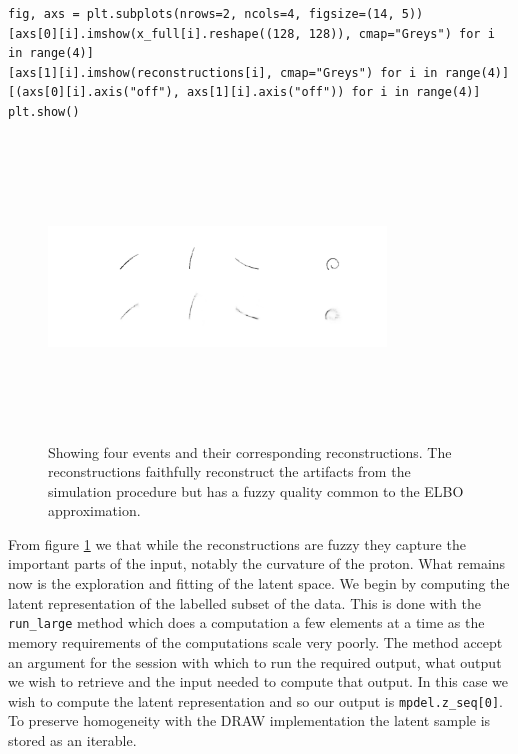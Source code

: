 \begin{minipage}{\linewidth}
\begin{lstlisting}[language=iPython]
fig, axs = plt.subplots(nrows=2, ncols=4, figsize=(14, 5))
[axs[0][i].imshow(x_full[i].reshape((128, 128)), cmap="Greys") for i in range(4)]
[axs[1][i].imshow(reconstructions[i], cmap="Greys") for i in range(4)]
[(axs[0][i].axis("off"), axs[1][i].axis("off")) for i in range(4)]
plt.show()
\end{lstlisting}
\begin{figure}[H]
\centering
\includegraphics[width=0.8\textwidth, height=8cm]{reconst_sim_events.pdf}
\caption[Simulated events and reconstructions]{Showing four events and their corresponding reconstructions. The reconstructions faithfully reconstruct the artifacts from the simulation procedure but has a fuzzy quality common to the ELBO approximation.}\label{fig:reconst_sim}
\end{figure}
\end{minipage}

From figure \ref{fig:reconst_sim} we that while the reconstructions are fuzzy they capture the important parts of the input, notably  the curvature of the proton. What remains now is the exploration and fitting of the latent space. We begin by computing the latent representation of the labelled subset of the data. This is done with the \lstinline{run_large} method which does a computation a few elements at a time as the memory requirements of the computations scale very poorly. The method accept an argument for the session with which to run the required output, what output we wish to retrieve and the input needed to compute that output. In this case we wish to compute the latent representation and so our output is \lstinline{mpdel.z_seq[0]}. To preserve homogeneity with the DRAW implementation the latent sample is stored as an iterable. 

